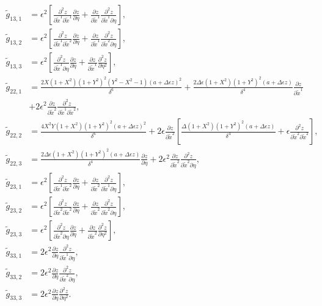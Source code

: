 \documentclass{article}
\begin{document}
\begin{align}
\tilde{g}_{13,1}&=\epsilon^2 \left[ \frac{\partial^2 z}{\partial \tilde{x}^1 \partial \tilde{x}^1} \frac{\partial z}{\partial \eta} + \frac{\partial z}{\partial \tilde{x}^1} \frac{\partial^2 z}{\partial \tilde{x}^1 \partial \eta} \right], \\
\tilde{g}_{13,2}&=\epsilon^2 \left[ \frac{\partial^2 z}{\partial \tilde{x}^1 \partial \tilde{x}^2} \frac{\partial z}{\partial \eta} + \frac{\partial z}{\partial \tilde{x}^1} \frac{\partial^2 z}{\partial \tilde{x}^2 \partial \eta} \right], \\
\tilde{g}_{13,3}&=\epsilon^2 \left[ \frac{\partial^2 z}{\partial \tilde{x}^1 \partial \eta} \frac{\partial z}{\partial \eta} + \frac{\partial z}{\partial \tilde{x}^1} \frac{\partial^2 z}{\partial \eta^2} \right], \\
\tilde{g}_{22,1}&=\frac{2X(1+X^2)(1+Y^2)^2(Y^2-X^2-1)(a+\Delta \epsilon z)^2}{\delta^6} + \frac{2\Delta \epsilon(1+X^2)(1+Y^2)^2(a+\Delta \epsilon z)}{\delta^4} \frac{\partial z}{\partial \tilde{x}^1} \nonumber \\ &+ 2\epsilon^2 \frac{\partial z}{\partial \tilde{x}^2} \frac{\partial^2 z}{\partial \tilde{x}^1 \partial \tilde{x}^2}, \\
\tilde{g}_{22,2}&=\frac{4X^2Y(1+X^2)(1+Y^2)^2(a+\Delta \epsilon z)^2}{\delta^6} + 2\epsilon \frac{\partial z}{\partial \tilde{x}^2} \left[ \frac{\Delta (1+X^2)(1+Y^2)^2(a+\Delta \epsilon z)}{\delta^4} + \epsilon \frac{\partial^2 z}{\partial \tilde{x}^2 \partial \tilde{x}^2} \right], \\
\tilde{g}_{22,3}&=\frac{2\Delta \epsilon(1+X^2)(1+Y^2)^2(a+\Delta \epsilon z)}{\delta^4} \frac{\partial z}{\partial \eta} + 2\epsilon^2 \frac{\partial z}{\partial \tilde{x}^2} \frac{\partial^2 z}{\partial \tilde{x}^2 \partial \eta}, \\
\tilde{g}_{23,1}&=\epsilon^2 \left[ \frac{\partial^2 z}{\partial \tilde{x}^1 \partial \tilde{x}^2} \frac{\partial z}{\partial \eta} + \frac{\partial z}{\partial \tilde{x}^2} \frac{\partial^2 z}{\partial \tilde{x}^1 \partial \eta} \right], \\
\tilde{g}_{23,2}&=\epsilon^2 \left[ \frac{\partial^2 z}{\partial \tilde{x}^2 \partial \tilde{x}^2} \frac{\partial z}{\partial \eta} + \frac{\partial z}{\partial \tilde{x}^2} \frac{\partial^2 z}{\partial \tilde{x}^2 \partial \eta} \right], \\
\tilde{g}_{23,3}&=\epsilon^2 \left[ \frac{\partial^2 z}{\partial \tilde{x}^2 \partial \eta} \frac{\partial z}{\partial \eta} + \frac{\partial z}{\partial \tilde{x}^2} \frac{\partial^2 z}{\partial \eta^2} \right], \\
\tilde{g}_{33,1}&=2\epsilon^2 \frac{\partial z}{\partial \eta} \frac{\partial^2 z}{\partial \tilde{x}^1 \partial \eta}, \\
\tilde{g}_{33,2}&=2\epsilon^2 \frac{\partial z}{\partial \eta} \frac{\partial^2 z}{\partial \tilde{x}^2 \partial \eta}, \\
\tilde{g}_{33,3}&=2\epsilon^2 \frac{\partial z}{\partial \eta} \frac{\partial^2 z}{\partial \eta^2}.
\end{align}
\end{document}
